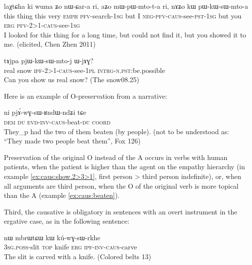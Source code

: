 \documentclass[oldfontcommands,oneside,a4paper,11pt]{memoir}
\newcommand{\ipa}[1]{{\phon #1}} %
\newcommand{\caus}{\textsc{caus}}
\newcommand{\coord}{\textsc{coord}}
\newcommand{\dem}{\textsc{dem}}
\newcommand{\du}{\textsc{du}}
\newcommand{\erg}{\textsc{erg}}
\newcommand{\emphat}{\textsc{emph}}
\newcommand{\evd}{\textsc{evd}}
\newcommand{\intrg}{\textsc{intrg}}
\newcommand{\inv}{\textsc{inv}}
\newcommand{\ipf}{\textsc{ipf}}
\newcommand{\negat}{\textsc{neg}}
\newcommand{\npst}{\textsc{n.pst}}
\newcommand{\pfv}{\textsc{pfv}}
\newcommand{\pl}{\textsc{pl}}
\newcommand{\poss}{\textsc{poss}}
\newcommand{\pst}{\textsc{pst}}
\newcommand{\sg}{\textsc{sg}}
\newcommand{\topic}{\textsc{top}}
\begin{document}
\begin{exe}
\ex
\gll \ipa{kɯki} 	\ipa{laχtɕha} 	\ipa{ki} 	\ipa{wuma} 	\ipa{ʑo} 	\ipa{nɯ-ɕar-a} 	\ipa{ri,} 	\ipa{aʑo} 	\ipa{mɯ-pɯ-mto-t-a} 	\ipa{ri,} 	\ipa{nɤʑo} 	\ipa{kɯ} 	\ipa{pɯ-kɯ-sɯ-mto-a}   \\
this thing this very \emphat{} \pfv{}-search-1\sg{} but I \negat{}-\pfv{}-\caus{}-see-\pst{}-1\sg{} but you \erg{}  \pfv{}-2>1-\caus{}-see-1\sg{} \\
 \glt I looked for this thing for a long time, but could not find it, but you showed it to me. (elicited, Chen Zhen 2011)
\end{exe} 

\begin{exe}
\ex
\gll   \ipa{koŋla} 	\ipa{tɤjpa} 	\ipa{pjɯ-kɯ-sɯ-mto-j} 	\ipa{ɯ-jɤɣ?}   \\
real snow \ipf{}-2>1-\caus{}-see-1\pl{} \intrg{}-\npst{}:be.possible  \\
 \glt Can you show us real snow? (The snow08.25)
\end{exe} 


Here is an example of O-preservation from a narrative:
\begin{exe} 
\ex \label{ex:caus:beaten}
\gll  \ipa{nɯnɯ} 	\ipa{ni} 	\ipa{pjɤ́-wɣ-sɯ-ʁndɯ-ndʑi} 	\ipa{tɕe}  \\
\dem{} \du{} \evd{}-\inv{}-\caus{}-beat-\du{} \coord{} \\
\glt They_p had the two of them beaten (by people). (not to be understood as: ``They made two people beat them'', Fox 126)
\end{exe} 
Preservation of the original O   instead of the A occurs in verbs with  human patients, when the patient is higher than the agent on the empathy hierarchy (in example \ref{ex:caus:show.2>3>1}, first person > third person indefinite), or, when all arguments are third person, when the O of the original verb is more topical than the A (example \ref{ex:caus:beaten}).


Third, the causative is obligatory in sentences with an overt instrument in the ergative case, as in the following sentence:

\begin{exe}
\ex
\gll  \ipa{ɯ-χto} 	\ipa{nɯ} 	\ipa{mbrɯtɕɯ} 	\ipa{kɯ} 	\ipa{kú-wɣ-sɯ-rkhe}  \\
3\sg{}.\poss{}-slit \topic{} knife \erg{}  \ipf{}-\inv{}-\caus{}-carve \\
 \glt  The slit is carved with a knife. (Colored belts 13)
\end{exe} 
\end{document}
